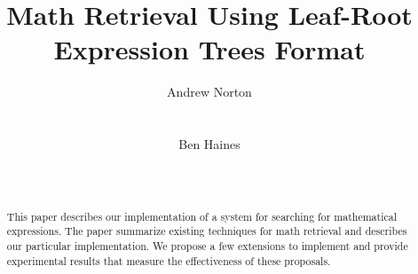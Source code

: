 \documentclass{sig-alternate}
\begin{document}
%

\title{Math Retrieval Using Leaf-Root Expression Trees
Format}

%
\author{
%
%
\alignauthor
Andrew Norton\titlenote{}\\
       \\
       \\
\alignauthor
Ben Haines\titlenote{}\\
       \\
       \\
}

\maketitle
\begin{abstract}
This paper describes our implementation of a system for
searching for mathematical expressions. The paper summarize
existing techniques for math retrieval and describes our particular
implementation. We propose a few extensions to implement and 
provide experimental results that measure the effectiveness of
these proposals.
\end{abstract}
\end{document}
